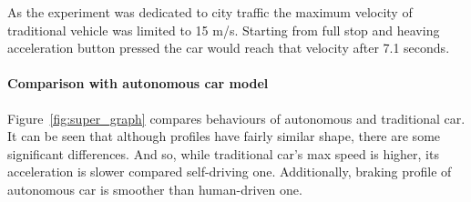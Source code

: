 \documentclass[11pt,english]{article}
\begin{document}
As the experiment was dedicated to city traffic the maximum velocity of traditional vehicle was limited to 15 m/s. Starting from full stop and heaving acceleration button pressed the car would reach that velocity after 7.1 seconds.






















\paragraph{Comparison with autonomous car model}


Figure~\ref{fig:super_graph} compares behaviours of autonomous and traditional car. It can be seen that although profiles have fairly similar shape, there are some significant differences. And so, while traditional car's max speed is higher, its acceleration is slower compared self-driving one. Additionally, braking profile of autonomous car is smoother than human-driven one.

\end{document}

